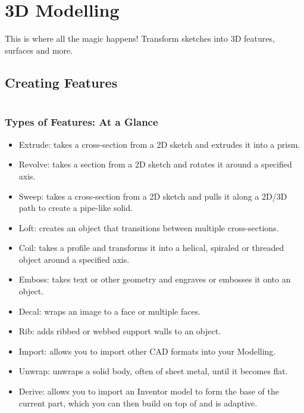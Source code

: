 \section{3D Modelling}

This is where all the magic happens! Transform sketches into 3D features, surfaces and more.

\subsection{Creating Features}

$ $

\subsubsection{Types of Features: At a Glance}
\begin{itemize}
\item Extrude: takes a cross-section from a 2D sketch and extrudes it into a prism.
\item Revolve: takes a section from a 2D sketch and rotates it around a specified axis.
\item Sweep: takes a cross-section from a 2D sketch and pulls it along a 2D/3D path to create a pipe-like solid.
\item Loft: creates an object that transitions between multiple cross-sections.
\item Coil: takes a profile and transforms it into a helical, spiraled or threaded object around a specified axis.
\item Emboss: takes text or other geometry and engraves or embosses it onto an object.
\item Decal: wraps an image to a face or multiple faces.
\item Rib: adds ribbed or webbed support walls to an object.
\item Import: allows you to import other CAD formats into your Modelling.
\item Unwrap: unwraps a solid body, often of sheet metal, until it becomes flat.
\item Derive: allows you to import an Inventor model to form the base of the current part, which you can then build on top of and is adaptive.
\end{itemize}


